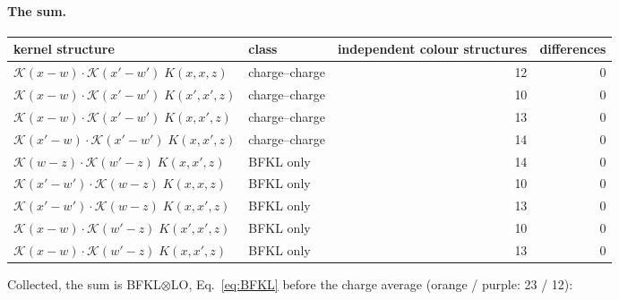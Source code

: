 \documentclass[10pt]{article}
\numberwithin{equation}{section}
\begin{document}
\paragraph{The sum.}
\begin{table}[H]\centering\small
\begin{tabular}{@{}llrr@{}}\toprule
kernel structure & class & independent colour structures & differences\\\midrule
$\mathcal K(x-w)\cdot\mathcal K(x'-w')\;K(x,x,z)$ & {\color{CC}charge--charge} & 12 & 0\\
$\mathcal K(x-w)\cdot\mathcal K(x'-w')\;K(x',x',z)$ & {\color{CC}charge--charge} & 10 & 0\\
$\mathcal K(x-w)\cdot\mathcal K(x'-w')\;K(x,x',z)$ & {\color{CC}charge--charge} & 13 & 0\\
$\mathcal K(x'-w)\cdot\mathcal K(x'-w')\;K(x,x',z)$ & {\color{CC}charge--charge} & 14 & 0\\
$\mathcal K(w-z)\cdot\mathcal K(w'-z)\;K(x,x',z)$ & {\color{BFK}BFKL only} & 14 & 0\\
$\mathcal K(x'-w')\cdot\mathcal K(w-z)\;K(x,x,z)$ & {\color{BFK}BFKL only} & 10 & 0\\
$\mathcal K(x'-w')\cdot\mathcal K(w-z)\;K(x,x',z)$ & {\color{BFK}BFKL only} & 13 & 0\\
$\mathcal K(x-w)\cdot\mathcal K(w'-z)\;K(x',x',z)$ & {\color{BFK}BFKL only} & 10 & 0\\
$\mathcal K(x-w)\cdot\mathcal K(w'-z)\;K(x,x',z)$ & {\color{BFK}BFKL only} & 13 & 0\\
\bottomrule
\end{tabular}
\end{table}
\noindent Collected, the sum is BFKL$\otimes$LO, Eq.~\eqref{eq:BFKL} before the charge average (orange / purple: 23 / 12):
\end{document}
